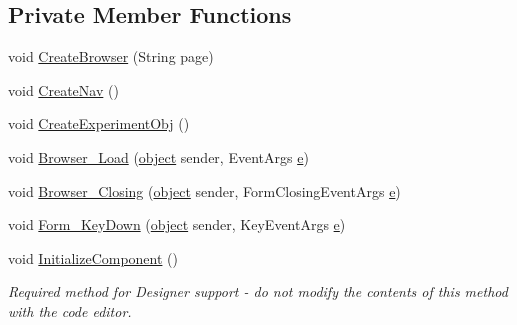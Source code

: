 \subsection*{Private Member Functions}
\begin{DoxyCompactItemize}
\item 
void \hyperlink{class_web_analyzer_1_1_u_i_1_1_h_t_m_l_u_i_afaacdee71a728c1cbe04087351e70395}{Create\+Browser} (String page)
\item 
void \hyperlink{class_web_analyzer_1_1_u_i_1_1_h_t_m_l_u_i_a274870a5d1268fa3a2e40d674cf8e61b}{Create\+Nav} ()
\item 
void \hyperlink{class_web_analyzer_1_1_u_i_1_1_h_t_m_l_u_i_af92127c0a733a77a2363ff1d8b26713b}{Create\+Experiment\+Obj} ()
\item 
void \hyperlink{class_web_analyzer_1_1_u_i_1_1_h_t_m_l_u_i_abc8c290c8b516e80333172298d96eb52}{Browser\+\_\+\+Load} (\hyperlink{_u_i_2_h_t_m_l_resources_2js_2lib_2underscore_8min_8js_aae18b7515bb2bc4137586506e7c0c903}{object} sender, Event\+Args \hyperlink{_u_i_2_h_t_m_l_resources_2js_2lib_2bootstrap_8min_8js_ab5902775854a8b8440bcd25e0fe1c120}{e})
\item 
void \hyperlink{class_web_analyzer_1_1_u_i_1_1_h_t_m_l_u_i_a18e4826c64957f86ccc5726d4b21e38b}{Browser\+\_\+\+Closing} (\hyperlink{_u_i_2_h_t_m_l_resources_2js_2lib_2underscore_8min_8js_aae18b7515bb2bc4137586506e7c0c903}{object} sender, Form\+Closing\+Event\+Args \hyperlink{_u_i_2_h_t_m_l_resources_2js_2lib_2bootstrap_8min_8js_ab5902775854a8b8440bcd25e0fe1c120}{e})
\item 
void \hyperlink{class_web_analyzer_1_1_u_i_1_1_h_t_m_l_u_i_a4ac4c943e02d07235a52edf88d2cc055}{Form\+\_\+\+Key\+Down} (\hyperlink{_u_i_2_h_t_m_l_resources_2js_2lib_2underscore_8min_8js_aae18b7515bb2bc4137586506e7c0c903}{object} sender, Key\+Event\+Args \hyperlink{_u_i_2_h_t_m_l_resources_2js_2lib_2bootstrap_8min_8js_ab5902775854a8b8440bcd25e0fe1c120}{e})
\item 
void \hyperlink{class_web_analyzer_1_1_u_i_1_1_h_t_m_l_u_i_a982fd123521466139710256dee65f7c4}{Initialize\+Component} ()
\begin{DoxyCompactList}\small\item\em Required method for Designer support -\/ do not modify the contents of this method with the code editor. \end{DoxyCompactList}\end{DoxyCompactItemize}
